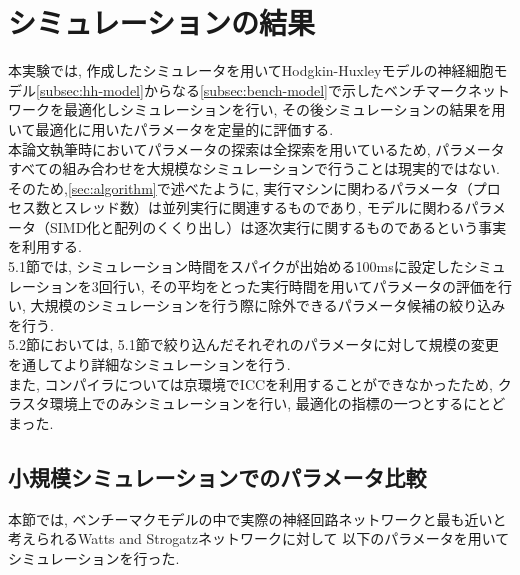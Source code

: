 \section{シミュレーションの結果}
\label{sec:sim-result}
本実験では, 作成したシミュレータを用いてHodgkin-Huxleyモデルの神経細胞モデル\ref{subsec:hh-model}からなる\ref{subsec:bench-model}で示したベンチマークネットワークを最適化しシミュレーションを行い,
その後シミュレーションの結果を用いて最適化に用いたパラメータを定量的に評価する.\\
本論文執筆時においてパラメータの探索は全探索を用いているため, パラメータすべての組み合わせを大規模なシミュレーションで行うことは現実的ではない.
そのため,\ref{sec:algorithm}で述べたように, 実行マシンに関わるパラメータ（プロセス数とスレッド数）は並列実行に関連するものであり,
モデルに関わるパラメータ（SIMD化と配列のくくり出し）は逐次実行に関するものであるという事実を利用する.\\
5.1節では, シミュレーション時間をスパイクが出始める100msに設定したシミュレーションを3回行い,
その平均をとった実行時間を用いてパラメータの評価を行い, 大規模のシミュレーションを行う際に除外できるパラメータ候補の絞り込みを行う.\\
5.2節においては, 5.1節で絞り込んだそれぞれのパラメータに対して規模の変更を通してより詳細なシミュレーションを行う.\\
また, コンパイラについては京環境でICCを利用することができなかったため, クラスタ環境上でのみシミュレーションを行い,
最適化の指標の一つとするにとどまった.\\

\subsection{小規模シミュレーションでのパラメータ比較}
\label{subsec:small-sim}
本節では, ベンチーマクモデルの中で実際の神経回路ネットワークと最も近いと考えられるWatts and Strogatzネットワークに対して
以下のパラメータを用いてシミュレーションを行った.\\
